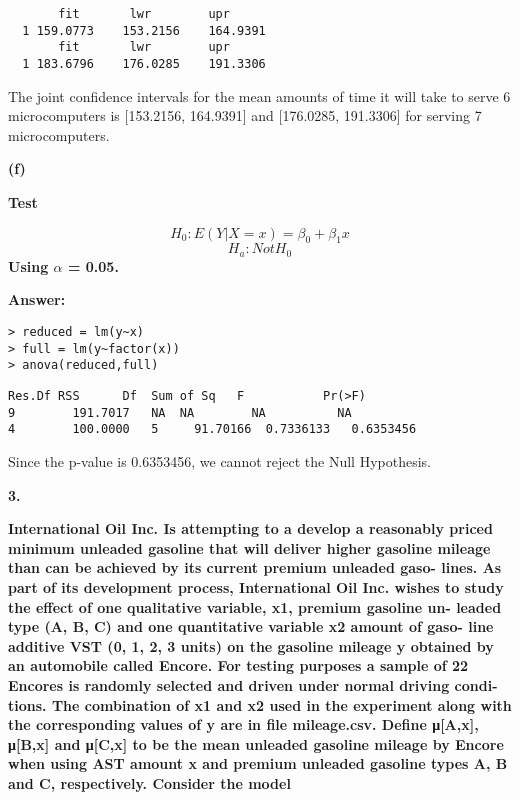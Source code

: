 \documentclass[letterpaper,11pt]{article}
\begin{document}
\begin{lstlisting}
       fit	     lwr	    upr
  1	159.0773	153.2156	164.9391
       fit	     lwr	    upr
  1	183.6796	176.0285	191.3306
\end{lstlisting}

 The joint confidence intervals for the mean amounts of time it will take to serve 6 microcomputers is [153.2156, 164.9391] and [176.0285, 191.3306] for serving 7 microcomputers.

\bigbreak
\begin{addmargin}[-1.1em]{0em}
\textbf{(f)}\par\end{addmargin}
\textbf{Test}\par
$$H_0 : E(Y|X=x)=\beta_0+\beta_1x $$
$$H_a : Not H_0$$
\textbf{Using $\alpha$ = 0.05.}\par

\bigbreak
\begin{addmargin}[-0.5em]{0em}
\textbf{Answer: }\end{addmargin}

\begin{lstlisting}
> reduced = lm(y~x)
> full = lm(y~factor(x))
> anova(reduced,full)
\end{lstlisting}

\begin{lstlisting}
Res.Df RSS	    Df	Sum of Sq	F	        Pr(>F)
9	     191.7017	NA	NA	      NA	      NA
4	     100.0000	5	  91.70166	0.7336133	0.6353456
\end{lstlisting}
Since the p-value is 0.6353456, we cannot reject the Null Hypothesis.


  \bigbreak
  \begin{addmargin}[-2em]{0em} \large{\textbf{3. }}\end{addmargin}

  \begin{addmargin}[-1.1em]{0em} \textbf{International Oil Inc. Is attempting to a develop a reasonably priced minimum unleaded gasoline that will deliver higher gasoline mileage than can be achieved by its current premium unleaded gaso- lines. As part of its development process, International Oil Inc. wishes to study the effect of one qualitative variable, x1, premium gasoline un- leaded type (A, B, C) and one quantitative variable x2 amount of gaso- line additive VST (0, 1, 2, 3 units) on the gasoline mileage y obtained by an automobile called Encore. For testing purposes a sample of 22 Encores is randomly selected and driven under normal driving condi- tions. The combination of x1 and x2 used in the experiment along with the corresponding values of y are in file mileage.csv. Define μ[A,x], μ[B,x] and μ[C,x] to be the mean unleaded gasoline mileage by Encore when using AST amount x and premium unleaded gasoline types A, B and C, respectively. Consider the model
}\par\end{addmargin}
\end{document}
